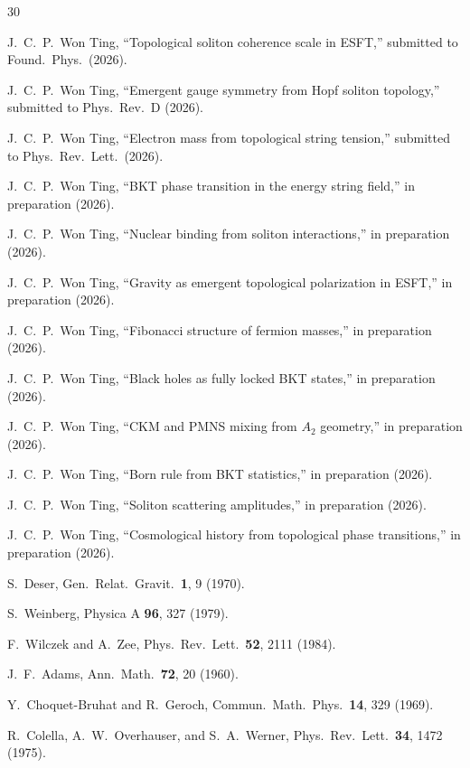 \documentclass[twocolumn,preprintnumbers,amsmath,amssymb,prd]{revtex4-2}
\begin{document}
\begin{thebibliography}{30}

 J.~C.~P.~Won Ting, ``Topological soliton coherence scale in ESFT,'' submitted to Found.\ Phys.\ (2026).

 J.~C.~P.~Won Ting, ``Emergent gauge symmetry from Hopf soliton topology,'' submitted to Phys.\ Rev.\ D (2026).

 J.~C.~P.~Won Ting, ``Electron mass from topological string tension,'' submitted to Phys.\ Rev.\ Lett.\ (2026).

 J.~C.~P.~Won Ting, ``BKT phase transition in the energy string field,'' in preparation (2026).

 J.~C.~P.~Won Ting, ``Nuclear binding from soliton interactions,'' in preparation (2026).

 J.~C.~P.~Won Ting, ``Gravity as emergent topological polarization in ESFT,'' in preparation (2026).

 J.~C.~P.~Won Ting, ``Fibonacci structure of fermion masses,'' in preparation (2026).

 J.~C.~P.~Won Ting, ``Black holes as fully locked BKT states,'' in preparation (2026).

 J.~C.~P.~Won Ting, ``CKM and PMNS mixing from $A_2$ geometry,'' in preparation (2026).

 J.~C.~P.~Won Ting, ``Born rule from BKT statistics,'' in preparation (2026).

 J.~C.~P.~Won Ting, ``Soliton scattering amplitudes,'' in preparation (2026).

 J.~C.~P.~Won Ting, ``Cosmological history from topological phase transitions,'' in preparation (2026).

 S.~Deser, Gen.\ Relat.\ Gravit.\ \textbf{1}, 9 (1970).

 S.~Weinberg, Physica A \textbf{96}, 327 (1979).

 F.~Wilczek and A.~Zee, Phys.\ Rev.\ Lett.\ \textbf{52}, 2111 (1984).

 J.~F.~Adams, Ann.\ Math.\ \textbf{72}, 20 (1960).

 Y.~Choquet-Bruhat and R.~Geroch, Commun.\ Math.\ Phys.\ \textbf{14}, 329 (1969).

 R.~Colella, A.~W.~Overhauser, and S.~A.~Werner, Phys.\ Rev.\ Lett.\ \textbf{34}, 1472 (1975).

\end{thebibliography}
\end{document}
